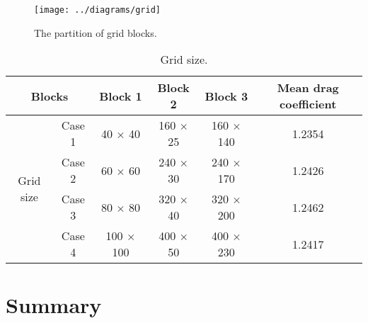 \begin{figure}[]
	\centering
	\texttt{[image: ../diagrams/grid]}
	\caption{The partition of grid blocks.}\label{fig: grid}
\end{figure}
\begin{table}[]
	\centering
	\caption{Grid size.}
	\label{tab: grid}
	\begin{tabular}{@{}cccccc@{}}
		\toprule
		\multicolumn{2}{c}{Blocks}  & Block 1  & Block 2   & Block 3 & Mean drag coefficient    \\ \midrule
		\multirow{4}{*}{Grid size} 
		& Case 1 & 40 $\times$ 40 & 160 $\times$ 25 & 160 $\times$ 140   & 1.2354 \\
		& Case 2 & 60 $\times$ 60 & 240 $\times$ 30 & 240 $\times$ 170   & 1.2426 \\
		& Case 3 & 80 $\times$ 80 & 320 $\times$ 40 & 320 $\times$ 200   & 1.2462 \\
		& Case 4 & 100 $\times$ 100 & 400 $\times$ 50 & 400 $\times$ 230 & 1.2417 \\
		\bottomrule
	\end{tabular}
\end{table}


\section{Summary}

